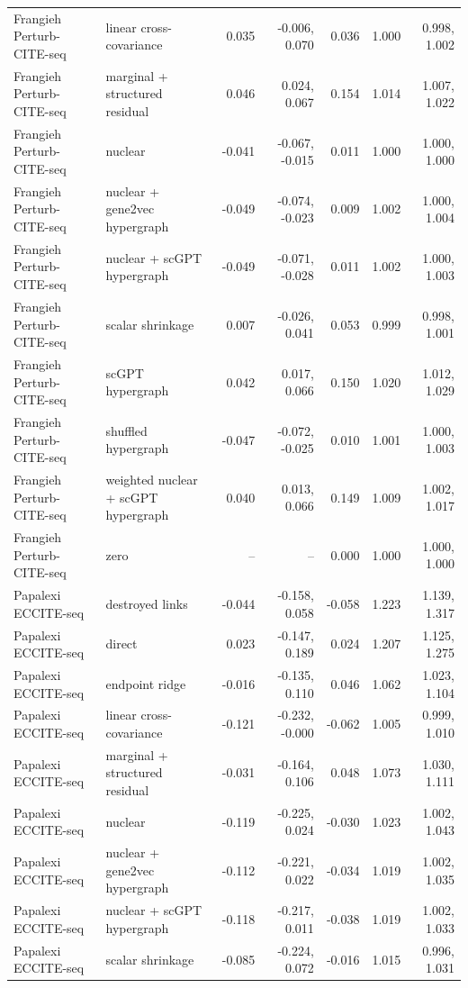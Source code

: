 \begin{longtable}{@{}p{2.5cm}p{5.0cm}rrrrr@{}}
Frangieh Perturb-CITE-seq & linear cross-covariance & 0.035 & -0.006, 0.070 & 0.036 & 1.000 & 0.998, 1.002 \\
Frangieh Perturb-CITE-seq & marginal + structured residual & 0.046 & 0.024, 0.067 & 0.154 & 1.014 & 1.007, 1.022 \\
Frangieh Perturb-CITE-seq & nuclear & -0.041 & -0.067, -0.015 & 0.011 & 1.000 & 1.000, 1.000 \\
Frangieh Perturb-CITE-seq & nuclear + gene2vec hypergraph & -0.049 & -0.074, -0.023 & 0.009 & 1.002 & 1.000, 1.004 \\
Frangieh Perturb-CITE-seq & nuclear + scGPT hypergraph & -0.049 & -0.071, -0.028 & 0.011 & 1.002 & 1.000, 1.003 \\
Frangieh Perturb-CITE-seq & scalar shrinkage & 0.007 & -0.026, 0.041 & 0.053 & 0.999 & 0.998, 1.001 \\
Frangieh Perturb-CITE-seq & scGPT hypergraph & 0.042 & 0.017, 0.066 & 0.150 & 1.020 & 1.012, 1.029 \\
Frangieh Perturb-CITE-seq & shuffled hypergraph & -0.047 & -0.072, -0.025 & 0.010 & 1.001 & 1.000, 1.003 \\
Frangieh Perturb-CITE-seq & weighted nuclear + scGPT hypergraph & 0.040 & 0.013, 0.066 & 0.149 & 1.009 & 1.002, 1.017 \\
Frangieh Perturb-CITE-seq & zero & -- & -- & 0.000 & 1.000 & 1.000, 1.000 \\
Papalexi ECCITE-seq & destroyed links & -0.044 & -0.158, 0.058 & -0.058 & 1.223 & 1.139, 1.317 \\
Papalexi ECCITE-seq & direct & 0.023 & -0.147, 0.189 & 0.024 & 1.207 & 1.125, 1.275 \\
Papalexi ECCITE-seq & endpoint ridge & -0.016 & -0.135, 0.110 & 0.046 & 1.062 & 1.023, 1.104 \\
Papalexi ECCITE-seq & linear cross-covariance & -0.121 & -0.232, -0.000 & -0.062 & 1.005 & 0.999, 1.010 \\
Papalexi ECCITE-seq & marginal + structured residual & -0.031 & -0.164, 0.106 & 0.048 & 1.073 & 1.030, 1.111 \\
Papalexi ECCITE-seq & nuclear & -0.119 & -0.225, 0.024 & -0.030 & 1.023 & 1.002, 1.043 \\
Papalexi ECCITE-seq & nuclear + gene2vec hypergraph & -0.112 & -0.221, 0.022 & -0.034 & 1.019 & 1.002, 1.035 \\
Papalexi ECCITE-seq & nuclear + scGPT hypergraph & -0.118 & -0.217, 0.011 & -0.038 & 1.019 & 1.002, 1.033 \\
Papalexi ECCITE-seq & scalar shrinkage & -0.085 & -0.224, 0.072 & -0.016 & 1.015 & 0.996, 1.031 \\

\end{longtable}
